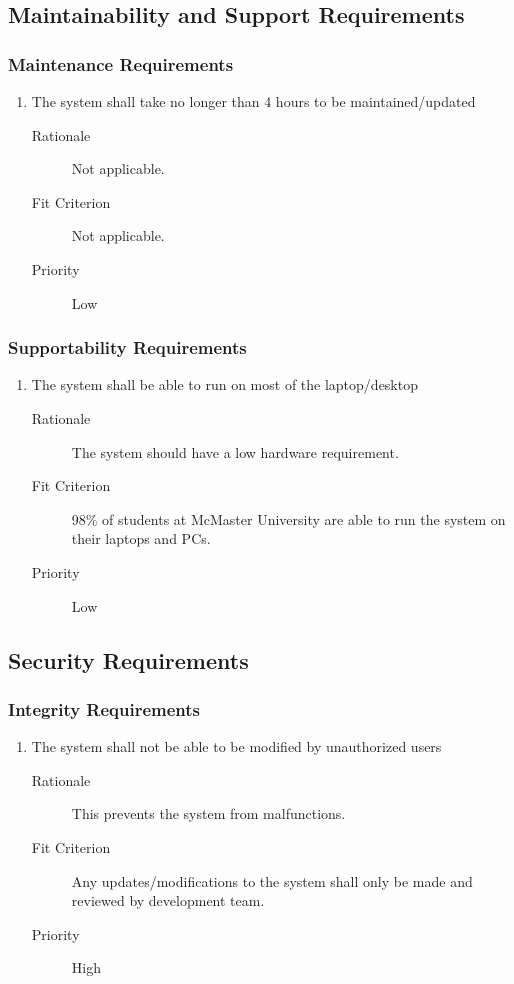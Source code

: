 \documentclass[12pt, titlepage]{article}
\begin{document}
\subsection{Maintainability and Support Requirements}
\subsubsection{Maintenance Requirements}
\begin{enumerate}[resume*=NFR]
\item The system shall take no longer than 4 hours to be maintained/updated
  \begin{description}
  \item[Rationale] Not applicable.
  \item[Fit Criterion] Not applicable.
  \item[Priority] Low
  \end{description}

\end{enumerate}

\subsubsection{Supportability Requirements}
\begin{enumerate}[resume*=NFR]
\item The system shall be able to run on most of the laptop/desktop
  \begin{description}
  \item[Rationale] The system should have a low hardware requirement.
  \item[Fit Criterion] 98\% of students at McMaster University are able to run the
    system on their laptops and PCs.
  \item[Priority] Low
  \end{description}

\end{enumerate}

\subsection{Security Requirements}
\subsubsection{Integrity Requirements}
\begin{enumerate}[resume*=NFR]
\item The system shall not be able to be modified by unauthorized users
  \begin{description}
  \item[Rationale] This prevents the system from malfunctions.
  \item[Fit Criterion] Any updates/modifications to the system shall only be made
    and reviewed by development team.
  \item[Priority] High
  \end{description}
\end{enumerate}
\end{document}
